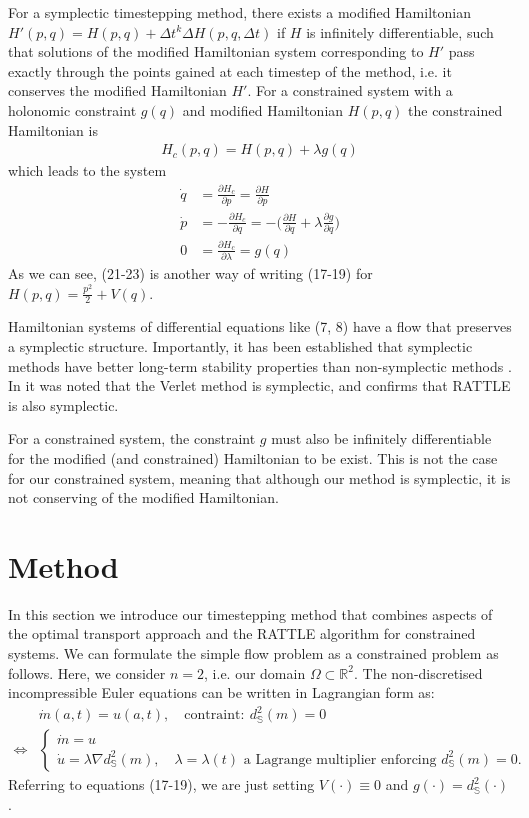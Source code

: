 \documentclass[11pt, oneside]{article}   	%
\newcommand{\R}{\mathbb{R}}
\newcommand{\dsmsq}{d^{2}_{\mathbb{S}}(m)}
\newcommand{\graddsmsq}{\nabla{d^{2}_{\mathbb{S}}(m)}}
\newcommand{\dt}{\Delta t}
\newcommand{\Sb}{\mathbb{S}}
\begin{document}
For a symplectic timestepping method, there exists a modified Hamiltonian \(H'(p, q) = H(p, q) + \dt^k \Delta H(p, q, \dt)\) if \(H\) is infinitely differentiable, such that solutions of the modified Hamiltonian system corresponding to \(H'\) pass exactly through the points gained at each timestep of the method, i.e. it conserves the modified Hamiltonian \(H'\). For a constrained system with a holonomic constraint \(g(q)\) and modified Hamiltonian \(H(p, q)\) the constrained Hamiltonian is
\begin{align}
H_c(p, q) = H(p, q) + \lambda g(q)
\end{align}
which leads to the system
\begin{align}
\dot{q} &= \frac{\partial H_c}{\partial p} = \frac{\partial H}{\partial p} \\
\dot{p} &= - \frac{\partial H_c}{\partial q} = - \Big( \frac{\partial H}{\partial q} + \lambda \frac{\partial g}{\partial q} \Big) \\
0 &= \frac{\partial H_c}{\partial \lambda} = g(q)
\end{align}
As we can see, (21-23) is another way of writing (17-19) for \(H(p, q) = \frac{p^2}{2} + V(q)\).

Hamiltonian systems of differential equations like (7, 8) have a flow that preserves a symplectic structure. Importantly, it has been established that symplectic methods have better long-term stability properties than non-symplectic methods \citep{okunbor1992explicit}. In \cite{ruth1983canonical} it was noted that the Verlet method is symplectic, and \cite{leimkuhler1994symplectic} confirms that RATTLE is also symplectic. 

For a constrained system, the constraint \(g\) must also be infinitely differentiable for the modified (and constrained) Hamiltonian to be exist. This is not the case for our constrained system, meaning that although our method is symplectic, it is not conserving of the modified Hamiltonian.


\section{Method}

In this section we introduce our timestepping method that combines aspects of the optimal transport approach and the RATTLE algorithm for constrained systems. We can formulate the simple flow problem as a constrained problem as follows. Here, we consider \(n=2\), i.e. our domain \(\Omega \subset \R^2\). The non-discretised incompressible Euler equations can be written in Lagrangian form as:
\begin{align}
& \dot{m}(a, t) = u(a,t), \quad \text{contraint}: \: \dsmsq = 0 \\
\iff
 &\begin{cases}
  \dot{m} = u \\
  \dot{u} = \lambda \graddsmsq, \quad \lambda = \lambda(t) \text{ a Lagrange multiplier enforcing } \dsmsq = 0.
 \end{cases} 
\end{align}
Referring to equations (17-19), we are just setting \(V(\cdot) \equiv 0\) and \(g(\cdot) = d^2_{\Sb}(\cdot)\).
\end{document}

